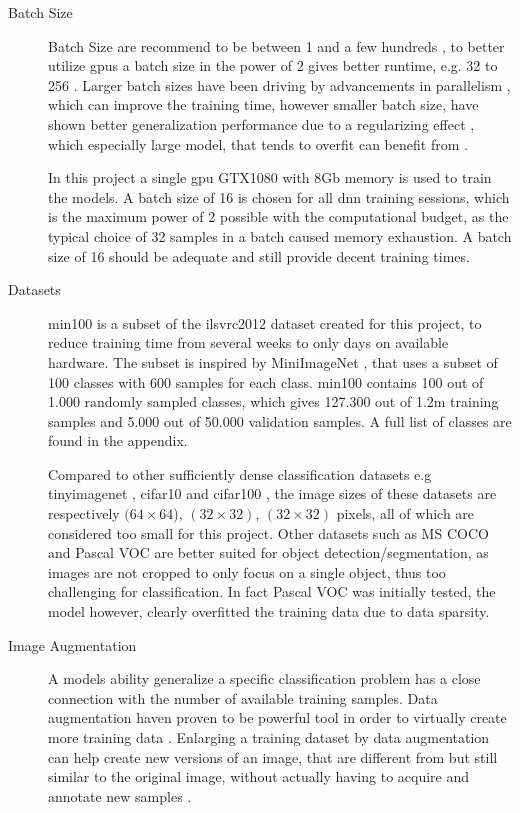 \begin{description}
	\item[Batch Size] Batch Size are recommend to be between 1 and a few hundreds \cite{bengio_practical_2012}, to better utilize \gls{gpu}s a batch size in the power of 2 gives better runtime, e.g. 32 to 256 \cite{goodfellow_deep_2016}. Larger batch sizes have been driving by advancements in parallelism \cite{dean_large_2012}, which can improve the training time, however smaller batch size, have shown better generalization performance due to a regularizing effect \cite{masters_revisiting_nodate}, which especially large model, that tends to overfit can benefit from \cite{goodfellow_deep_2016}. 
	
	In this project a single \gls{gpu} GTX1080 with 8Gb memory is used to train the models. A batch size of 16 is chosen for all \gls{dnn} training sessions, which is the maximum power of 2 possible with the computational budget, as the typical choice of 32 samples in a batch caused memory exhaustion. A batch size of 16 should be adequate and still provide decent training times.
	
	\item[Datasets] \gls{min100} is a subset of the \gls{ilsvrc2012} dataset \cite{russakovsky_imagenet_2015} created for this project, to reduce training time from several weeks to only days on available hardware. The subset is inspired by MiniImageNet \cite{vinyals_matching_2016}, that uses a subset of 100 classes with 600 samples for each class. \gls{min100} contains 100 out of 1.000 randomly sampled classes, which gives 127.300 out of 1.2m training samples and 5.000 out of 50.000 validation samples. A full list of classes are found in the appendix. 
	
	Compared to other sufficiently dense classification datasets e.g \gls{tinyimagenet} \cite{li_cs231n:_2018}, \gls{cifar10} and \gls{cifar100} \cite{krizhevsky_cifar-10_nodate}, the image sizes of these datasets are respectively $(64\times 64$), $(32\times 32)$, $(32\times 32)$ pixels, all of which are considered too small  for this project. Other datasets such as MS COCO and Pascal VOC are better suited for object detection/segmentation, as images are not cropped to only focus on a single object, thus too challenging for classification. In fact Pascal VOC was initially tested, the model however, clearly overfitted the training data due to data sparsity. 
	
	\item[Image Augmentation] A models ability generalize a specific classification problem has a close connection with the number of available training samples. Data augmentation haven proven to be powerful tool in order to virtually create more training data \cite{perez_effectiveness_2017}. Enlarging a training dataset by data augmentation can help create new versions of an image, that are different from but still similar to the original image, without actually having to acquire and annotate new samples \cite{goodfellow_deep_2016}.  
	

\end{description}
